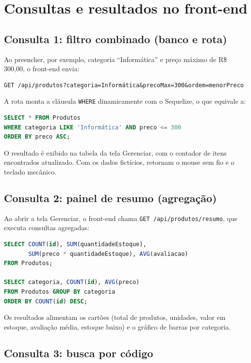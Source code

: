 \documentclass[12pt]{article}
\begin{document}
\section{Consultas e resultados no front-end}

\subsection{Consulta 1: filtro combinado (banco e rota)}

Ao preencher, por exemplo, categoria ``Informática'' e preço máximo de R\$ 300,00, o front-end envia:

\begin{lstlisting}
GET /api/produtos?categoria=Informática&precoMax=300&ordem=menorPreco
\end{lstlisting}

A rota monta a cláusula \texttt{WHERE} dinamicamente com o Sequelize, o que equivale a:

\begin{lstlisting}[language=SQL]
SELECT * FROM Produtos
WHERE categoria LIKE 'Informática' AND preco <= 300
ORDER BY preco ASC;
\end{lstlisting}

O resultado é exibido na tabela da tela Gerenciar, com o contador de itens encontrados atualizado. Com os dados fictícios, retornam o mouse sem fio e o teclado mecânico.

\subsection{Consulta 2: painel de resumo (agregação)}

Ao abrir a tela Gerenciar, o front-end chama \texttt{GET /api/produtos/resumo}, que executa consultas agregadas:

\begin{lstlisting}[language=SQL]
SELECT COUNT(id), SUM(quantidadeEstoque),
       SUM(preco * quantidadeEstoque), AVG(avaliacao)
FROM Produtos;

SELECT categoria, COUNT(id), AVG(preco)
FROM Produtos GROUP BY categoria
ORDER BY COUNT(id) DESC;
\end{lstlisting}

Os resultados alimentam os cartões (total de produtos, unidades, valor em estoque, avaliação média, estoque baixo) e o gráfico de barras por categoria.

\subsection{Consulta 3: busca por código}
\end{document}
